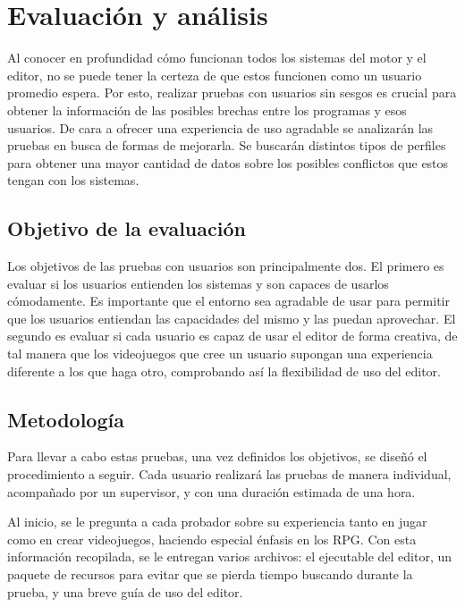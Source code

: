 \chapter{Evaluación y análisis}
\label{cap:conclusiones}

Al conocer en profundidad cómo funcionan todos los sistemas del motor y el editor, no se puede tener la certeza de que estos funcionen como un usuario promedio espera. Por esto, realizar pruebas con usuarios sin sesgos es crucial para obtener la información de las posibles brechas entre los programas y esos usuarios. De cara a ofrecer una experiencia de uso agradable se analizarán las pruebas en busca de formas de mejorarla. Se buscarán distintos tipos de perfiles para obtener una mayor cantidad de datos sobre los posibles conflictos que estos tengan con los sistemas.

\section{Objetivo de la evaluación}
Los objetivos de las pruebas con usuarios son principalmente dos. El primero es evaluar si los usuarios entienden los sistemas y son capaces de usarlos cómodamente. Es importante que el entorno sea agradable de usar para permitir que los usuarios entiendan las capacidades del mismo y las puedan aprovechar. El segundo es evaluar si cada usuario es capaz de usar el editor de forma creativa, de tal manera que los videojuegos que cree un usuario supongan una experiencia diferente a los que haga otro, comprobando así la flexibilidad de uso del editor.

\section{Metodología}
Para llevar a cabo estas pruebas, una vez definidos los objetivos, se diseñó el procedimiento a seguir. Cada usuario realizará las pruebas de manera individual, acompañado por un supervisor, y con una duración estimada de una hora.

\smallskip

Al inicio, se le pregunta a cada probador sobre su experiencia tanto en jugar como en crear videojuegos, haciendo especial énfasis en los RPG. Con esta información recopilada, se le entregan varios archivos: el ejecutable del editor, un paquete de recursos para evitar que se pierda tiempo buscando durante la prueba, y una breve guía de uso del editor.

\smallskip

